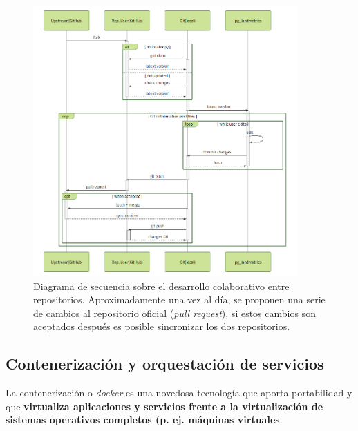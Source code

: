 \begin{itemize}
\begin{figure}
\begin{center}
\includegraphics[width=0.9\textwidth]{Metodologia/Figs/pullrequest.png}
\caption{Diagrama de secuencia sobre el desarrollo colaborativo entre repositorios. Aproximadamente una vez al día, se proponen una serie de cambios al repositorio oficial (\textit{pull request}), si estos cambios son aceptados después es posible sincronizar los dos repositorios. \label{fig:pullrequest}}
\end{center}
\end{figure}

\end{itemize}






\subsection{Contenerización y orquestación de servicios}\label{subsec:conten-orquest}

La contenerización o \textit{docker} es una novedosa tecnología que aporta portabilidad y que \textbf{virtualiza aplicaciones y servicios frente a la virtualización de sistemas operativos completos (p. ej. máquinas virtuales}.

